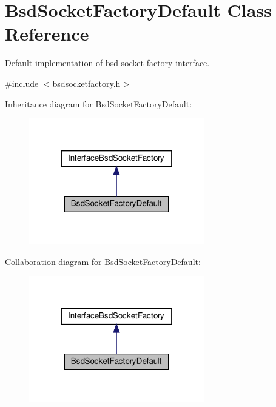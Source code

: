 \hypertarget{classBsdSocketFactoryDefault}{}\section{Bsd\+Socket\+Factory\+Default Class Reference}
\label{classBsdSocketFactoryDefault}


Default implementation of bsd socket factory interface.  




{\ttfamily \#include $<$bsdsocketfactory.\+h$>$}



Inheritance diagram for Bsd\+Socket\+Factory\+Default\+:\nopagebreak
\begin{figure}[H]
\begin{center}
\leavevmode
\includegraphics[width=216pt]{dd/da7/classBsdSocketFactoryDefault__inherit__graph}
\end{center}
\end{figure}


Collaboration diagram for Bsd\+Socket\+Factory\+Default\+:\nopagebreak
\begin{figure}[H]
\begin{center}
\leavevmode
\includegraphics[width=216pt]{d5/d23/classBsdSocketFactoryDefault__coll__graph}
\end{center}
\end{figure}
